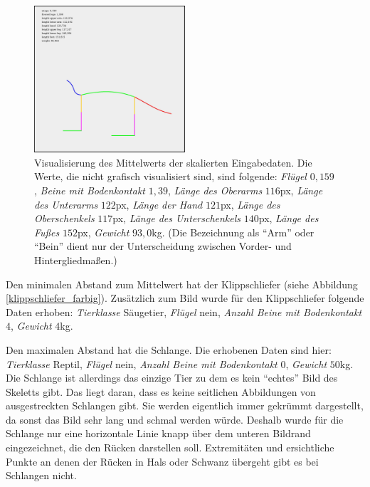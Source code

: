  \begin{figure}
  \centering
  \includegraphics[width=0.5\textwidth]{../PCA/mean_log_weight_downscaled_wings_legs_and_weight(onlyBox,stroke4).jpg}
  \caption{Visualisierung des Mittelwerts der skalierten Eingabedaten. Die Werte, die nicht grafisch visualisiert sind, sind folgende: \emph{Flügel} $0,159$, \emph{Beine mit Bodenkontakt} $1,39$, \emph{Länge des Oberarms} $116$px, \emph{Länge des Unterarms} $122$px, \emph{Länge der Hand} $121$px, \emph{Länge des Oberschenkels} $117$px, \emph{Länge des Unterschenkels} $140$px, \emph{Länge des Fußes} $152$px, \emph{Gewicht} $93,0$kg. (Die Bezeichnung als "`Arm"' oder "`Bein"' dient nur der Unterscheidung zwischen Vorder- und Hintergliedmaßen.)}
  \label{mean}
 \end{figure}
 
 Den minimalen Abstand zum Mittelwert hat der Klippschliefer (siehe Abbildung \ref{klippschliefer_farbig}). Zusätzlich zum Bild wurde für den Klippschliefer folgende Daten erhoben:
 \emph{Tierklasse} Säugetier, \emph{Flügel} nein, \emph{Anzahl Beine mit Bodenkontakt} $4$, \emph{Gewicht} $4$kg.
 
 Den maximalen Abstand hat die Schlange. Die erhobenen Daten sind hier:
 \emph{Tierklasse} Reptil, \emph{Flügel} nein, \emph{Anzahl Beine mit Bodenkontakt} $0$, \emph{Gewicht} $50$kg.\\
 Die Schlange ist allerdings das einzige Tier zu dem es kein "`echtes"' Bild des Skeletts gibt. Das liegt daran, dass es keine seitlichen Abbildungen von ausgestreckten Schlangen gibt. Sie werden eigentlich immer gekrümmt dargestellt, da sonst das Bild sehr lang und schmal werden würde. Deshalb wurde für die Schlange nur eine horizontale Linie knapp über dem unteren Bildrand eingezeichnet, die den Rücken darstellen soll. Extremitäten und ersichtliche Punkte an denen der Rücken in Hals oder Schwanz übergeht gibt es bei Schlangen nicht.
 

